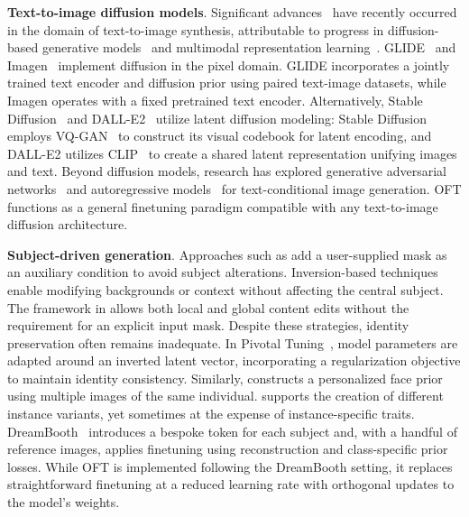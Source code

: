 \textbf{Text-to-image diffusion models}. Significant advances~\cite{saharia2022photorealistic,ramesh2022hierarchical,rombach2022high,gu2022vector,nichol2022glide} have recently occurred in the domain of text-to-image synthesis, attributable to progress in diffusion-based generative models~\cite{ho2020denoising,song2021score,song2021denoising,dhariwal2021diffusion} and multimodal representation learning~\cite{su2020vlbert,lu2019vilbert,radford2021learning,wang2021simvlm,li2022blip,li2023blip,alayrac2022flamingo,schuhmann2022laion}. GLIDE~\cite{nichol2022glide} and Imagen~\cite{saharia2022photorealistic} implement diffusion in the pixel domain. GLIDE incorporates a jointly trained text encoder and diffusion prior using paired text-image datasets, while Imagen operates with a fixed pretrained text encoder. Alternatively, Stable Diffusion~\cite{rombach2022high} and DALL-E2~\cite{ramesh2022hierarchical} utilize latent diffusion modeling: Stable Diffusion employs VQ-GAN~\cite{esser2021taming} to construct its visual codebook for latent encoding, and DALL-E2 utilizes CLIP~\cite{radford2021learning} to create a shared latent representation unifying images and text. Beyond diffusion models, research has explored generative adversarial networks~\cite{reed2016generative,zhang2017stackgan,xu2018attngan,li2019controllable} and autoregressive models~\cite{ramesh2021zero,ding2021cogview,wu2022nuwa,yuscaling} for text-conditional image generation. OFT functions as a general finetuning paradigm compatible with any text-to-image diffusion architecture.

\textbf{Subject-driven generation}. Approaches such as \cite{avrahami2022blended,nichol2022glide} add a user-supplied mask as an auxiliary condition to avoid subject alterations. Inversion-based techniques~\cite{choi2021ilvr,dhariwal2021diffusion,ramesh2022hierarchical,gal2022image} enable modifying backgrounds or context without affecting the central subject. The framework in \cite{hertz2022prompt} allows both local and global content edits without the requirement for an explicit input mask. Despite these strategies, identity preservation often remains inadequate. In Pivotal Tuning~\cite{roich2022pivotal}, model parameters are adapted around an inverted latent vector, incorporating a regularization objective to maintain identity consistency. Similarly, \cite{nitzan2022mystyle} constructs a personalized face prior using multiple images of the same individual. \cite{casanova2021instance} supports the creation of different instance variants, yet sometimes at the expense of instance-specific traits. DreamBooth~\cite{ruiz2023dreambooth} introduces a bespoke token for each subject and, with a handful of reference images, applies finetuning using reconstruction and class-specific prior losses. While OFT is implemented following the DreamBooth setting, it replaces straightforward finetuning at a reduced learning rate with orthogonal updates to the model's weights.

